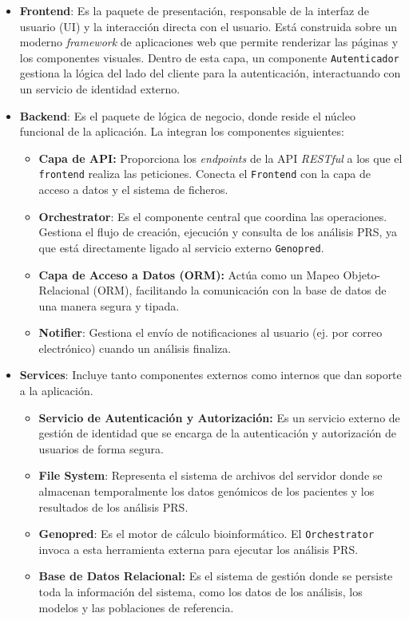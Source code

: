 \begin{itemize} 

    \item \textbf{Frontend}: Es la paquete de presentación, responsable de la interfaz de usuario (UI) y la interacción directa con el usuario. Está construida sobre un moderno \textit{framework} de aplicaciones web que permite renderizar las páginas y los componentes visuales. Dentro de esta capa, un componente \texttt{Autenticador} gestiona la lógica del lado del cliente para la autenticación, interactuando con un servicio de identidad externo.

    \item \textbf{Backend}: Es el paquete de lógica de negocio, donde reside el núcleo funcional de la aplicación. La integran los componentes siguientes:

        \begin{itemize} 

            \item \textbf{Capa de API:} Proporciona los \textit{endpoints} de la API \textit{RESTful} a los que el \texttt{frontend} realiza las peticiones. Conecta el \texttt{Frontend} con la capa de acceso a datos y el sistema de ficheros.
            \item \textbf{Orchestrator}: Es el componente central que coordina las operaciones. Gestiona el flujo de creación, ejecución y consulta de los análisis PRS, ya que está directamente ligado al servicio externo \texttt{Genopred}.
            \item \textbf{Capa de Acceso a Datos (ORM):} Actúa como un Mapeo Objeto-Relacional (ORM), facilitando la comunicación con la base de datos de una manera segura y tipada.
            \item \textbf{Notifier}: Gestiona el envío de notificaciones al usuario (ej. por correo electrónico) cuando un análisis finaliza.

        \end{itemize} 

    \item \textbf{Services}: Incluye tanto componentes externos como internos que dan soporte a la aplicación. 

        \begin{itemize} 

            \item \textbf{Servicio de Autenticación y Autorización:} Es un servicio externo de gestión de identidad que se encarga de la autenticación y autorización de usuarios de forma segura.
            \item \textbf{File System}: Representa el sistema de archivos del servidor donde se almacenan temporalmente los datos genómicos de los pacientes y los resultados de los análisis PRS. 
            \item \textbf{Genopred}: Es el motor de cálculo bioinformático. El \texttt{Orchestrator} invoca a esta herramienta externa para ejecutar los análisis PRS. 
            \item \textbf{Base de Datos Relacional:} Es el sistema de gestión donde se persiste toda la información del sistema, como los datos de los análisis, los modelos y las poblaciones de referencia.


\end{itemize}
\end{itemize}
